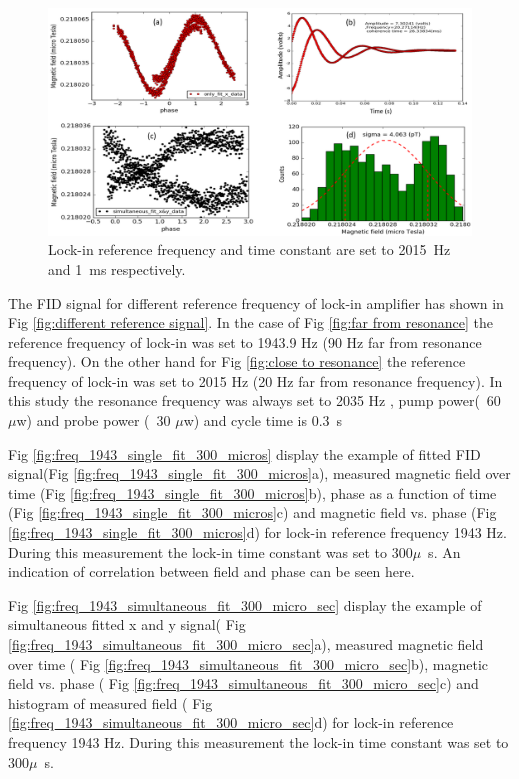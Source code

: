   \begin{figure}[h]
\centering\includegraphics[width=0.8\linewidth]{figures/freq_2015_simultaneous_fit_1ms.png}
\caption{Lock-in reference frequency and time constant are set to 2015~Hz and 1~ms respectively. \label{fig:freq_2015_1ms}}
\end{figure}


 
  The FID signal for different reference frequency of lock-in amplifier has shown in Fig \ref{fig:different reference signal}. In the case of Fig \ref{fig:far from resonance} the reference frequency of lock-in was set to 1943.9 Hz (90 Hz far from resonance frequency). On the other hand for Fig \ref{fig:close to resonance} the reference frequency of lock-in was set to 2015 Hz (20 Hz far from resonance frequency). In this study the resonance frequency was always set to 2035 Hz , pump power(~60 $\mu$w) and probe power (~30 $\mu$w) and cycle time is 0.3~s
  
  Fig \ref{fig:freq_1943_single_fit_300_micros} display the example of fitted FID signal(Fig \ref{fig:freq_1943_single_fit_300_micros}a), measured magnetic field over time (Fig \ref{fig:freq_1943_single_fit_300_micros}b), phase as a function of time (Fig \ref{fig:freq_1943_single_fit_300_micros}c) and magnetic field vs. phase (Fig \ref{fig:freq_1943_single_fit_300_micros}d) for lock-in reference frequency 1943 Hz. During this measurement the lock-in time constant was set to 300$\mu$~s. An  indication of correlation between field and phase can be seen here.
  
   Fig \ref{fig:freq_1943_simultaneous_fit_300_micro_sec} display the example of simultaneous fitted x and y signal( Fig \ref{fig:freq_1943_simultaneous_fit_300_micro_sec}a), measured magnetic field over time ( Fig \ref{fig:freq_1943_simultaneous_fit_300_micro_sec}b), magnetic field vs. phase ( Fig \ref{fig:freq_1943_simultaneous_fit_300_micro_sec}c) and histogram of measured field ( Fig \ref{fig:freq_1943_simultaneous_fit_300_micro_sec}d) for lock-in reference frequency 1943 Hz. During this measurement the lock-in time constant was set to 300$\mu$~s. 
   
